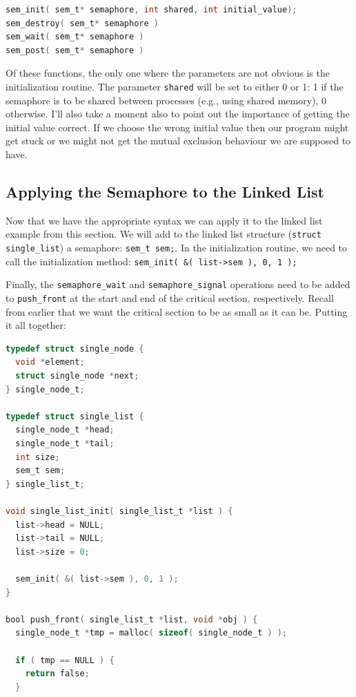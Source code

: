 \documentclass[a4paper]{report}
\begin{document}
\begin{appendices}
\begin{lstlisting}[language=C]
sem_init( sem_t* semaphore, int shared, int initial_value);
sem_destroy( sem_t* semaphore )
sem_wait( sem_t* semaphore )
sem_post( sem_t* semaphore )
\end{lstlisting}

Of these functions, the only one where the parameters are not obvious is the initialization routine. The parameter \texttt{shared} will be set to either 0 or 1: 1 if the semaphore is to be shared between processes (e.g., using shared memory), 0 otherwise. I'll also take a moment also to point out the importance of getting the initial value correct. If we choose the wrong initial value then our program might get stuck or we might not get the mutual exclusion behaviour we are supposed to have.

\subsection*{Applying the Semaphore to the Linked List}

Now that we have the appropriate syntax we can apply it to the linked list example from this section. We will add to the linked list structure (\texttt{struct single\_list}) a semaphore: \texttt{sem\_t sem;}. In the initialization routine, we need to call the initialization method: \texttt{sem\_init( \&( list->sem ), 0, 1 );}

Finally, the \texttt{semaphore\_wait} and \texttt{semaphore\_signal} operations need to be added to \texttt{push\_front} at the start and end of the critical section, respectively. Recall from earlier that we want the critical section to be as small as it can be. Putting it all together:

\begin{lstlisting}[language=C]
typedef struct single_node {
  void *element;
  struct single_node *next;
} single_node_t;

typedef struct single_list {
  single_node_t *head;
  single_node_t *tail;
  int size;
  sem_t sem;
} single_list_t;

void single_list_init( single_list_t *list ) {
  list->head = NULL;
  list->tail = NULL;
  list->size = 0;

  sem_init( &( list->sem ), 0, 1 );
}

bool push_front( single_list_t *list, void *obj ) {
  single_node_t *tmp = malloc( sizeof( single_node_t ) );
  
  if ( tmp == NULL ) {
    return false;
  }
  

\end{lstlisting}
\end{appendices}
\end{document}

